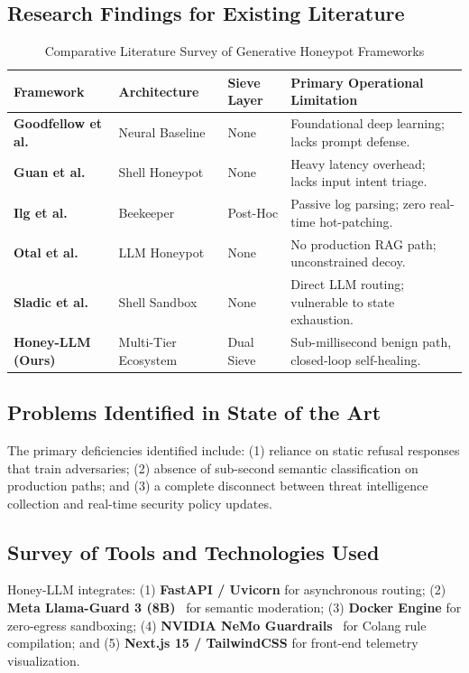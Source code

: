 \documentclass[12pt,a4paper,oneside]{report}
\begin{document}
\subsection{Research Findings for Existing Literature}
\begin{table}[H]
\small
\renewcommand{\arraystretch}{1.2}
\begin{tabularx}{\textwidth}{@{}p{1.2in} p{0.9in} p{0.9in} X@{}}
\rowcolor{HeaderGray} \textbf{Framework} & \textbf{Architecture} & \textbf{Sieve Layer} & \textbf{Primary Operational Limitation} \\
\hline
\textbf{Goodfellow et al.~\cite{goodfellow2016deep}} & Neural Baseline & None & Foundational deep learning; lacks prompt defense. \\
\textbf{Guan et al.~\cite{guan2024honeyllm}} & Shell Honeypot & None & Heavy latency overhead; lacks input intent triage. \\
\textbf{Ilg et al.~\cite{ilg2025beekeeper}} & Beekeeper & Post-Hoc & Passive log parsing; zero real-time hot-patching. \\
\textbf{Otal et al.~\cite{otal2024llmhoneypot}} & LLM Honeypot & None & No production RAG path; unconstrained decoy. \\
\textbf{Sladic et al.~\cite{sladic2024llmshell}} & Shell Sandbox & None & Direct LLM routing; vulnerable to state exhaustion. \\
\textbf{Honey-LLM (Ours)} & Multi-Tier Ecosystem & Dual Sieve & Sub-millisecond benign path, closed-loop self-healing. \\
\hline
\end{tabularx}
\caption{Comparative Literature Survey of Generative Honeypot Frameworks}
\end{table}

\subsection{Problems Identified in State of the Art}
The primary deficiencies identified include: (1) reliance on static refusal responses that train adversaries; (2) absence of sub-second semantic classification on production paths; and (3) a complete disconnect between threat intelligence collection and real-time security policy updates.

\subsection{Survey of Tools and Technologies Used}
Honey-LLM integrates: (1) \textbf{FastAPI / Uvicorn} for asynchronous routing; (2) \textbf{Meta Llama-Guard 3 (8B)}~\cite{llamaguard3} for semantic moderation; (3) \textbf{Docker Engine} for zero-egress sandboxing; (4) \textbf{NVIDIA NeMo Guardrails}~\cite{nemo2024guardrails} for Colang rule compilation; and (5) \textbf{Next.js 15 / TailwindCSS} for front-end telemetry visualization.
\end{document}

